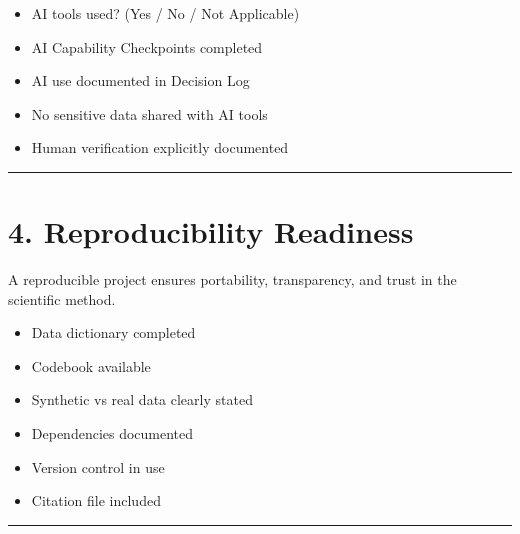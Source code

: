 \documentclass[
]{report}
\providecommand{\tightlist}{%
  \setlength{\itemsep}{0pt}\setlength{\parskip}{0pt}}
\begin{document}
\begin{itemize}
\tightlist
\item[$\square$]
  AI tools used? (Yes / No / Not Applicable)
\item[$\square$]
  AI Capability Checkpoints completed
\item[$\square$]
  AI use documented in Decision Log
\item[$\square$]
  No sensitive data shared with AI tools
\item[$\square$]
  Human verification explicitly documented
\end{itemize}

\begin{center}\rule{0.5\linewidth}{0.5pt}\end{center}

\chapter{4. Reproducibility Readiness}\label{reproducibility-readiness}

\begin{tcolorbox}[enhanced jigsaw, coltitle=black, colbacktitle=quarto-callout-note-color!10!white, toptitle=1mm, colframe=quarto-callout-note-color-frame, left=2mm, opacitybacktitle=0.6, bottomtitle=1mm, opacityback=0, title=\textcolor{quarto-callout-note-color}{\faInfo}\hspace{0.5em}{Note}, titlerule=0mm, arc=.35mm, rightrule=.15mm, toprule=.15mm, breakable, colback=white, leftrule=.75mm, bottomrule=.15mm]

A reproducible project ensures portability, transparency, and trust in
the scientific method.

\end{tcolorbox}

\begin{itemize}
\tightlist
\item[$\square$]
  Data dictionary completed
\item[$\square$]
  Codebook available
\item[$\square$]
  Synthetic vs real data clearly stated
\item[$\square$]
  Dependencies documented
\item[$\square$]
  Version control in use
\item[$\square$]
  Citation file included
\end{itemize}

\begin{center}\rule{0.5\linewidth}{0.5pt}\end{center}
\end{document}
